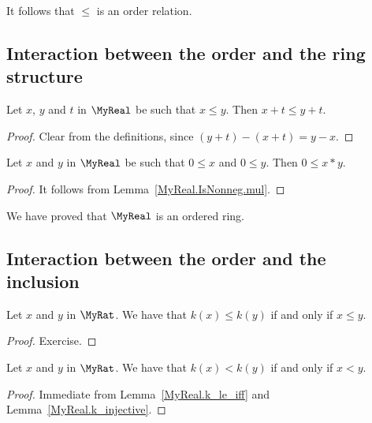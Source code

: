 It follows that $\leq$ is an order relation.

\subsection{Interaction between the order and the ring structure}

\begin{lemma}
    \label{MyReal.add_le_add_left}
    \leanok
    Let $x$, $y$ and $t$ in $\MyReal$ be such that $x \leq y$. Then $x + t \leq y + t$.
\end{lemma}
\begin{proof}
    \leanok
    Clear from the definitions, since $(y + t) - (x + t) = y - x$.
\end{proof}

\begin{lemma}
    \label{MyReal.mul_nonneg}
    \leanok
    Let $x$ and $y$ in $\MyReal$ be such that $0 \leq x$ and $0 \leq y$. Then $0 \leq x * y$.
\end{lemma}
\begin{proof}
    \leanok
    It follows from Lemma~\ref{MyReal.IsNonneg.mul}.
\end{proof}

We have proved that $\MyReal$ is an ordered ring.

\subsection{Interaction between the order and the inclusion}

\begin{lemma}
    \label{MyReal.k_le_iff}
    \leanok
    Let $x$ and $y$ in $\MyRat$. We have that $k(x) \leq k(y)$ if and only if $x \leq y$.
\end{lemma}
\begin{proof}
    \leanok
    Exercise.
\end{proof}

\begin{lemma}
    \label{MyReal.k_lt_iff}
    \leanok
    Let $x$ and $y$ in $\MyRat$. We have that $k(x) < k(y)$ if and only if $x < y$.
\end{lemma}
\begin{proof}
    \leanok
    Immediate from Lemma~\ref{MyReal.k_le_iff} and Lemma~\ref{MyReal.k_injective}.
\end{proof}

